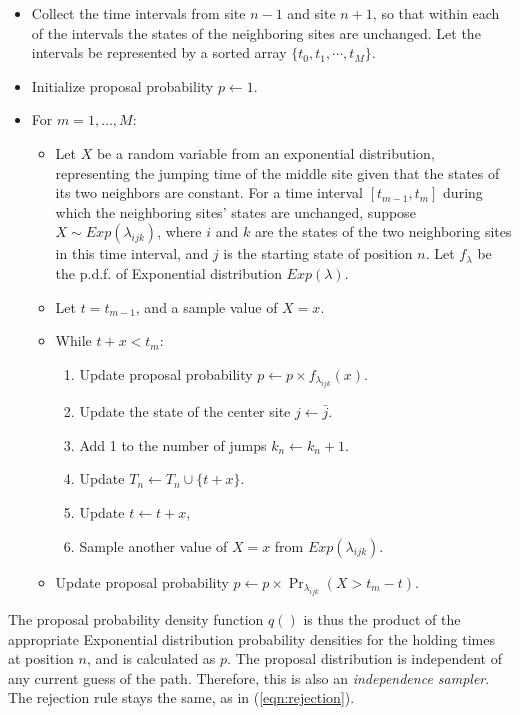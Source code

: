 \documentclass[11pt]{article}
\begin{document}
\begin{itemize}
\item Collect the time intervals from site $n-1$ and site $n+1$, so
  that within each of the intervals the states of the neighboring
  sites are unchanged. Let the intervals be represented by a sorted
  array $\{t_0, t_1, \cdots, t_M\}$.
\item Initialize proposal probability $p\leftarrow 1$.
\item For $m = 1, \ldots, M$:
  \begin{itemize}
  \item Let $X$ be a random variable from an exponential distribution,
    representing the jumping time of the middle site given that the states
    of its two neighbors are constant.  For a time interval $[t_{m-1},
    t_m]$ during which the neighboring sites' states are unchanged,
    suppose $X \sim \mathit{Exp}(\lambda_{ijk})$, where $i$ and $k$ are the
    states of the two neighboring sites in this time interval, and $j$ is
    the starting state of position $n$. Let $f_{\lambda}$ be the p.d.f. of
    Exponential distribution $\mathit{Exp}(\lambda)$.
  \item Let $t = t_{m-1}$, and a sample value of $X=x$.
  \item While $t + x < t_m$:
    \begin{enumerate}[label={(\arabic*)}]
    \item Update proposal probability $p \leftarrow p\times f_{\lambda_{ijk}}(x)$.
    \item Update the state of the center site $j \leftarrow \bar{j}$.
    \item Add 1 to the number of jumps $k_n \leftarrow k_n +1$.
    \item Update $T_n \leftarrow T_n\cup\{t+x\}$.
    \item Update $t \leftarrow  t+x$,
    \item Sample another value of $X=x$ from $\mathit{Exp}(\lambda_{ijk})$.
    \end{enumerate}
  \item Update proposal probability $p \leftarrow p\times \Pr_{\lambda_{ijk}}(X > t_m - t )$.
  \end{itemize}
\end{itemize}

The proposal probability density function $q()$ is thus the product of
the appropriate Exponential distribution probability densities for the
holding times at position $n$, and is calculated as $p$. The proposal
distribution is independent of any current guess of the
path. Therefore, this is also an \textit{independence sampler}. The
rejection rule stays the same, as in (\ref{eqn:rejection}).
\end{document}
